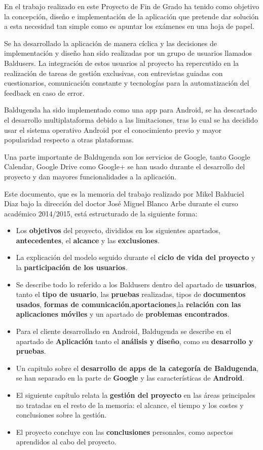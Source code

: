 En el trabajo realizado en este Proyecto de Fin de Grado ha tenido como objetivo la concepción, diseño e implementación de la aplicación que pretende dar solución a esta necesidad tan simple como es apuntar los exámenes en una hoja de papel.

Se ha desarrollado la aplicación de manera cíclica y las decisiones de implementación y diseño han sido realizadas por un grupo de usuarios llamados Baldusers. La integración de estos usuarios al proyecto ha repercutido en la realización de tareas de gestión exclusivas, con entrevistas guiadas con cuestionarios, comunicación constante y tecnologías para la automatización del feedback en caso de error.

\gls{Baldugenda} ha sido implementado como una app para Android, se ha descartado el desarrollo multiplataforma debido a las limitaciones, tras lo cual se ha decidido usar el sistema operativo Android por el conocimiento previo y mayor popularidad respecto a otras plataformas.

Una parte importante de Baldugenda son los servicios de Google, tanto Google Calendar, Google Drive como Google+ se han usado durante el desarrollo del proyecto y dan mayores funcionalidades a la aplicación.

Este documento, que es la memoria del trabajo realizado por Mikel Balduciel Diaz
bajo la dirección del doctor José Miguel Blanco Arbe durante el curso académico 2014/2015, está estructurado de la siguiente forma:

\begin{itemize}
	\item Los \textbf{objetivos} del proyecto, divididos en los siguientes apartados, \textbf{antecedentes}, el \textbf{alcance} y las \textbf{exclusiones}.
	\item La explicación del modelo seguido durante el \textbf{ciclo de vida del proyecto} y la \textbf{participación de los usuarios}.
	\item Se describe todo lo referido a los  \glspl{Balduser} dentro del apartado de \textbf{usuarios}, tanto el \textbf{tipo de usuario}, las \textbf{pruebas} realizadas, tipos de \textbf{documentos usados}, \textbf{formas de comunicación},\textbf{aportaciones},la \textbf{relación con las aplicaciones móviles} y un apartado de \textbf{problemas encontrados}.
	\item Para el cliente desarrollado en Android, Baldugenda se describe en el apartado de \textbf{Aplicación} tanto el \textbf{análisis y diseño}, como su \textbf{desarrollo y pruebas}.
	\item Un capitulo sobre el \textbf{desarrollo de apps de la categoría de Baldugenda}, se han separado en la parte de \textbf{Google} y las características de \textbf{Android}.
	\item El siguiente capítulo relata la \textbf{gestión del proyecto} en las áreas principales no tratadas en el resto de la memoria: el alcance, el tiempo y los costes y conclusiones sobre la gestión.
	\item El proyecto concluye con las \textbf{conclusiones} personales, como aspectos aprendidos al cabo del proyecto.
\end{itemize}

